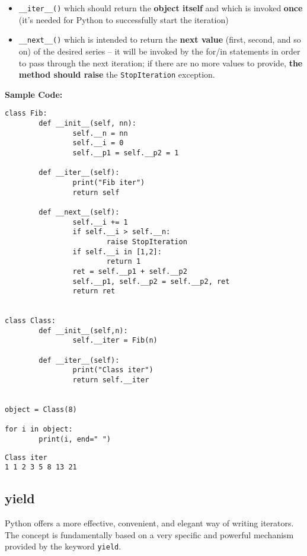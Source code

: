 \documentclass[11pt]{article}
\begin{document}
\begin{itemize}
\item \texttt{\_\_iter\_\_()} which should return the \textbf{object itself} and which is
invoked \textbf{once} (it’s needed for Python to successfully start the
iteration)

\item \texttt{\_\_next\_\_()} which is intended to return the \textbf{next value} (first,
second, and so on) of the desired series – it will be invoked by the
for/in statements in order to pass through the next iteration; if
there are no more values to provide, \textbf{the method should raise} the
\texttt{StopIteration} exception.
\end{itemize}

\textbf{Sample Code:}

\begin{verbatim}
class Fib:
        def __init__(self, nn):
                self.__n = nn
                self.__i = 0
                self.__p1 = self.__p2 = 1

        def __iter__(self):
                print("Fib iter")
                return self

        def __next__(self):
                self.__i += 1
                if self.__i > self.__n:
                        raise StopIteration
                if self.__i in [1,2]:
                        return 1
                ret = self.__p1 + self.__p2
                self.__p1, self.__p2 = self.__p2, ret
                return ret


class Class:
        def __init__(self,n):
                self.__iter = Fib(n)

        def __iter__(self):
                print("Class iter")
                return self.__iter


object = Class(8)

for i in object:
        print(i, end=" ")

\end{verbatim}

\begin{verbatim}
Class iter
1 1 2 3 5 8 13 21 
\end{verbatim}

\subsection{yield}
\label{sec:orgeca5892}
Python offers a more effective, convenient, and elegant way of writing
iterators. The concept is fundamentally based on a very specific and
powerful mechanism provided by the keyword \texttt{yield}. 
\end{document}
